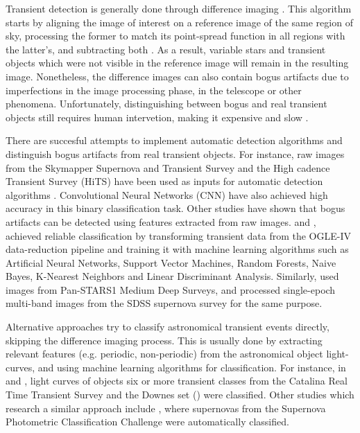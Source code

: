 Transient detection is generally done through 
difference imaging \citep{1507.05137,1608.01733,1708.02850}. 
This algorithm starts by aligning the image of interest on a reference image of the
same region of sky, processing the former to match its point-spread
function in all regions with the latter's, and subtracting both
\citep{astro-ph/9712287}. 
As a result, variable stars and transient objects which were not
visible in the reference image will remain in the resulting
image. 
Nonetheless, the difference images can also contain bogus
artifacts due to imperfections in the image processing
phase, in the telescope or other phenomena. 
Unfortunately, distinguishing between bogus and real transient objects
still requires human intervetion, making it expensive and slow
\citep{2011arXiv1110.4655D}.  


There are succesful attempts to implement automatic detection
algorithms and distinguish bogus artifacts from real transient
objects.  
For instance, raw images from the  Skymapper Supernova and Transient
Survey and the High cadence Transient Survey (HiTS) have been used as
inputs for automatic detection algorithms \citep{1708.08947,1701.00458}.
Convolutional Neural Networks (CNN) have also achieved
high accuracy in this binary classification task.
Other studies have shown that bogus artifacts can be detected using
features extracted from raw images. 
\cite{1601.06151} and \cite{1601.06320}, achieved reliable
classification by transforming transient data from the OGLE-IV
data-reduction pipeline and training it with machine learning
algorithms such as Artificial Neural Networks, Support Vector
Machines, Random Forests, Naive Bayes, K-Nearest Neighbors and Linear
Discriminant Analysis.  
Similarly, \cite{1501.05470} used images from Pan-STARS1 Medium Deep
Surveys, and \cite{1407.4118} processed single-epoch multi-band images
from the SDSS supernova survey for the same purpose.  



Alternative approaches try to classify astronomical transient events directly, skipping the difference imaging process.
This is usually done by extracting relevant features (e.g. periodic, non-periodic) from the astronomical object light-curves, and using machine learning algorithms for classification. For instance, in \cite{1401.3211} and \cite{1601.03931}, light curves of objects six or more transient classes from the Catalina Real Time Transient Survey and the Downes set (\cite{d05}) were classified. Other studies which research a similar approach include \cite{1603.00882}, where supernovas from the Supernova Photometric Classification Challenge were automatically classified.

